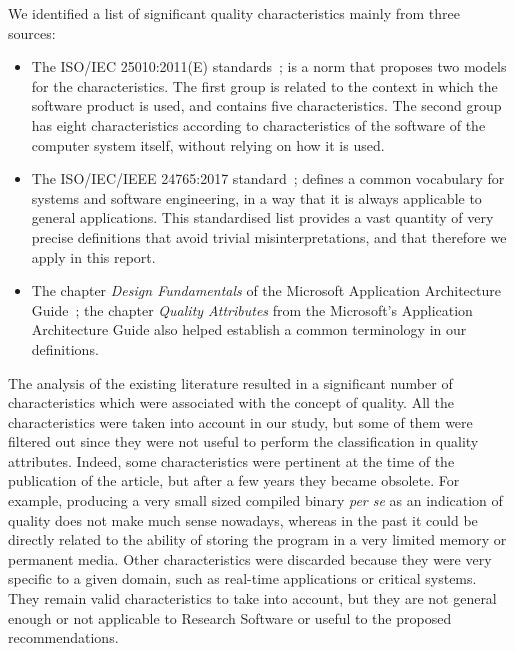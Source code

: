 We identified a list of significant quality characteristics mainly from three sources:

\begin{itemize}
    \item The ISO/IEC 25010:2011(E) standards~\cite{iso_25010_2011_2017}; is a norm that proposes two models for the characteristics. The first group is related to the context in which the software product is used, and contains five characteristics. The second group has eight characteristics according to characteristics of the software of the computer system itself, without relying on how it is used.

    \item The ISO/IEC/IEEE 24765:2017 standard~\cite{iso_iec_24765_2017}; defines a common vocabulary for systems and software engineering, in a way that it is always applicable to general applications. This standardised list provides a vast quantity of very precise definitions that avoid trivial misinterpretations, and that therefore we apply in this report.

    \item The chapter \textit{Design Fundamentals} of the Microsoft Application Architecture Guide~\cite{microsoft_2010}; the chapter \textit{Quality Attributes} from the Microsoft's Application Architecture Guide also helped establish a common terminology in our definitions.

\end{itemize}


The analysis of the existing literature resulted in a significant number of characteristics which were associated with the concept of quality. All the characteristics were taken into account in our study, but some of them were filtered out since they were not useful to perform the classification in quality attributes. Indeed, some characteristics were pertinent at the time of the publication of the article, but after a few years they became obsolete. For example, producing a very small sized compiled binary \textit{per se} as an indication of quality does not make much sense nowadays, whereas in the past it could be directly related to the ability of storing the program in a very limited memory or permanent media. Other characteristics were discarded because they were very specific to a given domain, such as real-time applications or critical systems. They remain valid characteristics to take into account, but they are not general enough or not applicable to Research Software or useful to the proposed recommendations.

